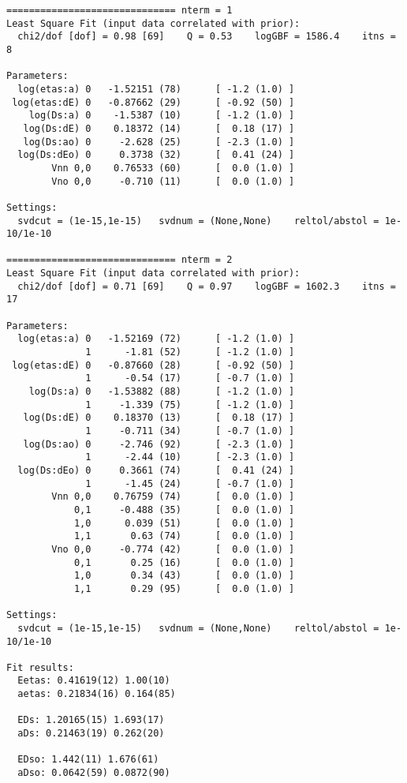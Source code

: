 \documentclass[letterpaper,10pt,english]{sphinxmanual}
\begin{document}
\begin{itemize}
\begin{Verbatim}[commandchars=\\\{\}]
============================== nterm = 1
Least Square Fit (input data correlated with prior):
  chi2/dof [dof] = 0.98 [69]    Q = 0.53    logGBF = 1586.4    itns = 8

Parameters:
  log(etas:a) 0   -1.52151 (78)      [ -1.2 (1.0) ]
 log(etas:dE) 0   -0.87662 (29)      [ -0.92 (50) ]
    log(Ds:a) 0    -1.5387 (10)      [ -1.2 (1.0) ]
   log(Ds:dE) 0    0.18372 (14)      [  0.18 (17) ]
   log(Ds:ao) 0     -2.628 (25)      [ -2.3 (1.0) ]
  log(Ds:dEo) 0     0.3738 (32)      [  0.41 (24) ]
        Vnn 0,0    0.76533 (60)      [  0.0 (1.0) ]
        Vno 0,0     -0.710 (11)      [  0.0 (1.0) ]

Settings:
  svdcut = (1e-15,1e-15)   svdnum = (None,None)    reltol/abstol = 1e-10/1e-10

============================== nterm = 2
Least Square Fit (input data correlated with prior):
  chi2/dof [dof] = 0.71 [69]    Q = 0.97    logGBF = 1602.3    itns = 17

Parameters:
  log(etas:a) 0   -1.52169 (72)      [ -1.2 (1.0) ]
              1      -1.81 (52)      [ -1.2 (1.0) ]
 log(etas:dE) 0   -0.87660 (28)      [ -0.92 (50) ]
              1      -0.54 (17)      [ -0.7 (1.0) ]
    log(Ds:a) 0   -1.53882 (88)      [ -1.2 (1.0) ]
              1     -1.339 (75)      [ -1.2 (1.0) ]
   log(Ds:dE) 0    0.18370 (13)      [  0.18 (17) ]
              1     -0.711 (34)      [ -0.7 (1.0) ]
   log(Ds:ao) 0     -2.746 (92)      [ -2.3 (1.0) ]
              1      -2.44 (10)      [ -2.3 (1.0) ]
  log(Ds:dEo) 0     0.3661 (74)      [  0.41 (24) ]
              1      -1.45 (24)      [ -0.7 (1.0) ]
        Vnn 0,0    0.76759 (74)      [  0.0 (1.0) ]
            0,1     -0.488 (35)      [  0.0 (1.0) ]
            1,0      0.039 (51)      [  0.0 (1.0) ]
            1,1       0.63 (74)      [  0.0 (1.0) ]
        Vno 0,0     -0.774 (42)      [  0.0 (1.0) ]
            0,1       0.25 (16)      [  0.0 (1.0) ]
            1,0       0.34 (43)      [  0.0 (1.0) ]
            1,1       0.29 (95)      [  0.0 (1.0) ]

Settings:
  svdcut = (1e-15,1e-15)   svdnum = (None,None)    reltol/abstol = 1e-10/1e-10

Fit results:
  Eetas: 0.41619(12) 1.00(10)
  aetas: 0.21834(16) 0.164(85)

  EDs: 1.20165(15) 1.693(17)
  aDs: 0.21463(19) 0.262(20)

  EDso: 1.442(11) 1.676(61)
  aDso: 0.0642(59) 0.0872(90)


\end{Verbatim}
\end{itemize}
\end{document}
